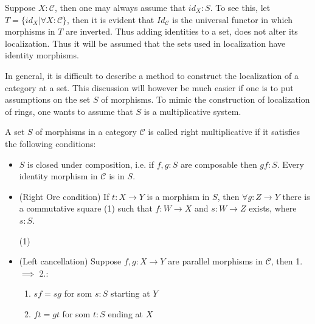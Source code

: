     \begin{remark}
        Suppose $X:\mathcal{C}$, then one may always assume that $id_{X}:S$. To see this, let $T = \{id_{X} |\forall X:\mathcal{C} \}$, then it is evident that $Id_{\mathcal{C}}$ is the universal functor in which morphisms in $T$ are inverted. Thus adding identities to a set, does not alter its localization. Thus it will be assumed that the sets used in localization have identity morphisms.
    \end{remark}

    In general, it is difficult to describe a method to construct the localization of a category at a set. This discussion will however be much easier if one is to put assumptions on the set $S$ of morphisms. To mimic the construction of localization of rings, one wants to assume that $S$ is a multiplicative system.

    \begin{definition}
        A set $S$ of morphisms in a category $\mathcal{C}$ is called right multiplicative if it satisfies the following conditions:
        \begin{itemize}
            \item $S$ is closed under composition, i.e. if $f,g : S$ are composable then $gf : S$. Every identity morphism in $\mathcal{C}$ is in $S$.
            \item (Right Ore condition) If $t : X \rightarrow Y$ is a morphism in $S$, then $\forall g:Z\rightarrow Y$ there is a commutative square (1) such that $f:W\rightarrow X$ and $s:W\rightarrow Z$ exists, where $s:S$.
            \begin{center}
                (1)
            \end{center}
            \item (Left cancellation) Suppose $f,g:X\rightarrow Y$ are parallel morphisms in $\mathcal{C}$, then 1. $\implies$ 2.:
            \begin{enumerate}
                \item $sf = sg$ for som $s:S$ starting at $Y$
                \item $ft = gt$ for som $t:S$ ending at $X$
            \end{enumerate}
        \end{itemize}
    \end{definition}

